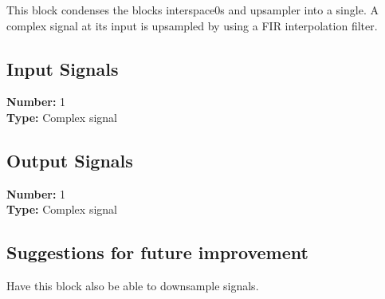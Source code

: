 This block condenses the blocks interspace0s and upsampler into a single. A complex signal at its input is upsampled by using a FIR interpolation filter.


\subsection*{Input Signals}

\textbf{Number:} 1\\
\textbf{Type:} Complex signal

\subsection*{Output Signals}

\textbf{Number:} 1\\
\textbf{Type:} Complex signal

\subsection*{Suggestions for future improvement}

Have this block also be able to downsample signals.